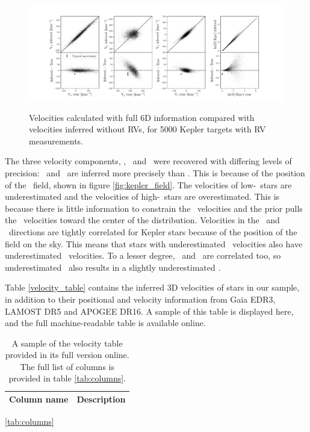 \begin{figure}[ht!]
\caption{Velocities calculated with full 6D information compared with
    velocities inferred without RVs, for 5000 Kepler targets with RV
    measurements.}
  \centering
    \includegraphics[width=1\textwidth]{residuals}
\label{fig:residuals}
\end{figure}

The three velocity components, \vx, \vy\ and \vz\ were recovered with
differing levels of precision: \vx\ and \vz\ are inferred more precisely than
\vy.
This is because of the position of the \kepler\ field, shown in figure
\ref{fig:kepler_field}.
The velocities of low-\vy\ stars are underestimated and the velocities of
high-\vy\ stars are overestimated.
This is because there is little information to constrain the \vy\ velocities
and the prior pulls the \vy\ velocities toward the center of the distribution.
Velocities in the \y\ and \z\ directions are tightly correlated for Kepler
stars because of the position of the field on the sky.
This means that stars with underestimated \vy\ velocities also have
underestimated \vz\ velocities.
To a lesser degree, \vy\ and \vx\ are correlated too, so underestimated \vy\
also results in a slightly underestimated \vx.

Table \ref{velocity_table} contains the inferred 3D velocities of stars in our
sample, in addition to their positional and velocity information from
Gaia EDR3, LAMOST DR5 and APOGEE DR16.
A sample of this table is displayed here, and the full machine-readable table
is available online.

\begin{table}[h!]
  \begin{center}
      \caption{
A sample of the velocity table provided in its full version online.
      The full list of columns is provided in table \ref{tab:columns}.
      }
    \label{tab:data}
\begin{tabular}{cc}
    Column name & Description \\
\hline
\end{tabular}
\end{center}
\ref{tab:columns}
\end{table}

